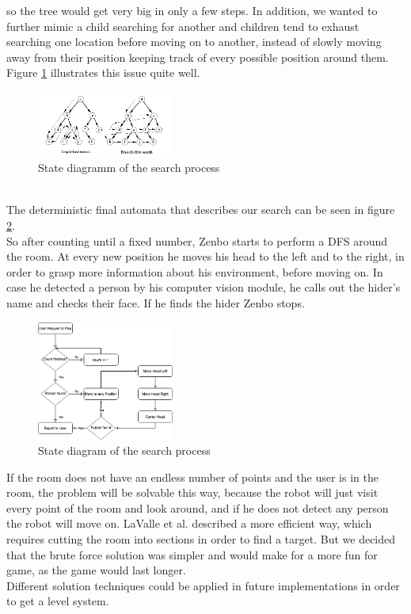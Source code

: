 \documentclass[conference]{IEEEtran}
\begin{document}
so the tree would get very big in only a few steps. In addition, we wanted to further mimic a child searching for another and
children tend to exhaust searching one location before moving on to another, 
instead of slowly moving away from their position keeping track of every possible position around them.
Figure \ref{fig:dfs_vsbfs} illustrates this issue quite well.
\begin{figure}[h]  \label{fig:dfs_vsbfs}
	\begin{center}
		\includegraphics[width=0.4\textwidth]{pics/DFS_VS_BFS.png}
	\end{center}
	\caption{State diagramm of the search process}
\end{figure}\\
The deterministic final automata that describes our search can be seen in figure \ref{fig:zenboSeek}. \\
So after counting until a fixed number, Zenbo starts to perform a DFS around the room.
At every new position he moves his head to the left and to the right, in order to grasp more information about his environment, before moving on. In case he detected a person by 
his computer vision module, he calls out the hider's name and checks their face. If he finds the hider Zenbo stops.
\begin{figure}[h]  \label{fig:zenboSeek}
	\begin{center}
		\includegraphics[width=0.4\textwidth]{pics/ZenboSeek.png}
	\end{center}
	\caption{State diagram of the search process}
\end{figure}
If the room does not have an endless number of points and the user is in the room, 
the problem will be solvable this way, because the robot will just visit every point of the room and look around, and 
if he does not detect any person the robot will move on.
LaValle et al. \cite{b3} described a more efficient way, which requires cutting the room into sections in order to find a target.
But we decided that the brute force solution was simpler and would make for a more fun for game, as the game would last longer.\\
Different solution techniques could be applied in future implementations in order to get a level system.
\end{document}
